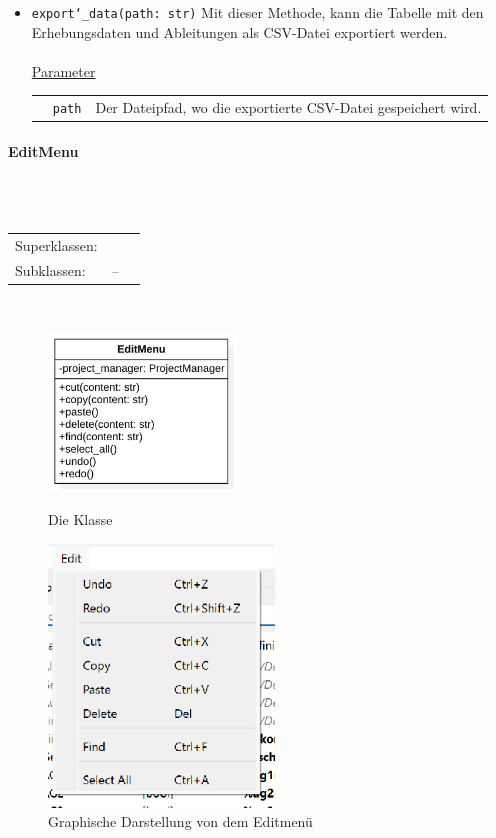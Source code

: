 \documentclass{article}
\newcommand{\classheader}[2][]{\paragraph{#2}
\mbox{}\textit{#1}\\\\}
\newcommand{\classref}[1]{\texttt{\nameref{cls:#1}}}
\begin{document}
\begin{itemize}
\item \texttt{export\char`_data(path: str)} \newline Mit dieser Methode, kann die Tabelle mit den Erhebungsdaten und Ableitungen als CSV-Datei exportiert werden.
\\\\
\underline{{Parameter}}\\
\begin{tabular}{lll}
 & \texttt{path} & Der Dateipfad, wo die exportierte CSV-Datei gespeichert wird. \\
\end{tabular}
\end{itemize}

\newpage
\classheader[]{EditMenu}\label{cls:EditMenu}
\begin{tabular}{lll}
 Superklassen: & \classref{Menu}\\
 Subklassen: & --\\
\end{tabular}\\
\begin{figure}[H]%
    \centering
    \begin{minipage}[b]{0.4\textwidth}
        \includegraphics[width=5cm]{entwurf/Entwurf_dokument/img/klassenView/EditMenu.png}
        \caption{Die Klasse \classref{EditMenu}}
    \end{minipage}
    \hfill
    \begin{minipage}[b]{0.4\textwidth}
        \includegraphics[width=6cm]{entwurf/Entwurf_dokument/img/Alissa/FileMenuGUI.png} %
        \caption{Graphische Darstellung von dem Editmenü}
        \label{fig:EditMenuGUI}
    \end{minipage}
\end{figure}
\end{document}

